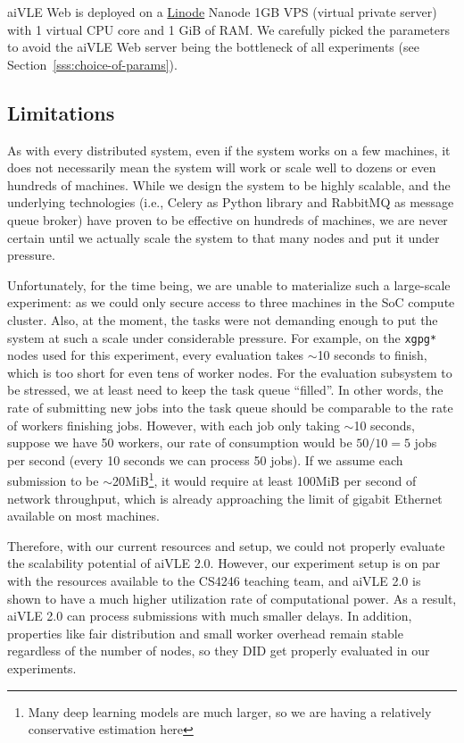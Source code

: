 aiVLE Web is deployed on a \href{https://linode.com/}{Linode} Nanode 1GB VPS (virtual private server) with 1 virtual CPU core and 1 GiB of RAM. We carefully picked the parameters to avoid the aiVLE Web server being the bottleneck of all experiments (see Section~\ref{sss:choice-of-params}).

\subsection{Limitations}
\label{ss:deployment-limitations}
As with every distributed system, even if the system works on a few machines, it does not necessarily mean the system will work or scale well to dozens or even hundreds of machines. While we design the system to be highly scalable, and the underlying technologies (i.e., Celery as Python library and RabbitMQ as message queue broker) have proven to be effective on hundreds of machines, we are never certain until we actually scale the system to that many nodes and put it under pressure.

Unfortunately, for the time being, we are unable to materialize such a large-scale experiment: as we could only secure access to three machines in the SoC compute cluster. Also, at the moment, the tasks were not demanding enough to put the system at such a scale under considerable pressure. For example, on the \texttt{xgpg*} nodes used for this experiment, every evaluation takes $\sim$10 seconds to finish, which is too short for even tens of worker nodes. For the evaluation subsystem to be stressed, we at least need to keep the task queue ``filled''. In other words, the rate of submitting new jobs into the task queue should be comparable to the rate of workers finishing jobs. However, with each job only taking $\sim$10 seconds, suppose we have 50 workers, our rate of consumption would be $50/10=5$ jobs per second (every 10 seconds we can process 50 jobs). If we assume each submission to be $\sim$20MiB\footnote{Many deep learning models are much larger, so we are having a relatively conservative estimation here}, it would require at least 100MiB per second of network throughput, which is already approaching the limit of gigabit Ethernet available on most machines.

Therefore, with our current resources and setup, we could not properly evaluate the scalability potential of aiVLE 2.0. However, our experiment setup is on par with the resources available to the CS4246 teaching team, and aiVLE 2.0 is shown to have a much higher utilization rate of computational power. As a result, aiVLE 2.0 can process submissions with much smaller delays. In addition, properties like fair distribution and small worker overhead remain stable regardless of the number of nodes, so they DID get properly evaluated in our experiments.

